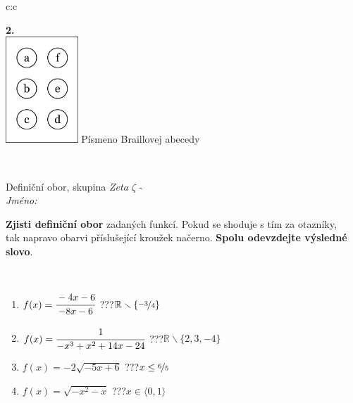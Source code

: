 \documentclass[10pt]{report}
\begin{document}
\begin{tabular}{c:c}
\begin{minipage}[c][104.5mm][t]{0.5\linewidth}
\begin{center}
\begin{minipage}{0.20\linewidth}
\begin{center}
{\Huge\bfseries 2.} \\[2mm]
\includegraphics[height=40mm]{../images/braille.png}
{\small Písmeno Braillovej abecedy}
\end{center}
\end{minipage}
\end{center}
\end{minipage}
\\ \hdashline
\begin{minipage}[c][104.5mm][t]{0.5\linewidth}
\begin{center}
\vspace{7mm}
{\huge Definiční obor, skupina \textit{Zeta $\zeta$} -}\\[5mm]
\textit{Jméno:}\phantom{xxxxxxxxxxxxxxxxxxxxxxxxxxxxxxxxxxxxxxxxxxxxxxxxxxxxxxxxxxxxxxxxx}\\[5mm]
\begin{minipage}{0.95\linewidth}
\begin{center}
\textbf{Zjisti definiční obor} zadaných funkcí. Pokud se shoduje s tím za otazníky,\\tak napravo obarvi příslušející kroužek načerno. \textbf{Spolu odevzdejte výsledné slovo}.
\end{center}
\end{minipage}
\\[1mm]
\begin{minipage}{0.79\linewidth}
\begin{center}
\begin{varwidth}{\linewidth}
\begin{enumerate}
\normalsizerrr
\item $f(x)=\cfrac{-4x-6}{-8x-6}$\quad \dotfill\; ???\;\dotfill \quad $\mathbb{R}\smallsetminus\{\nicefrac{-3}{4}\}$
\item $f(x)=\cfrac{1}{-x^3+x^2+14x-24}$\quad \dotfill\; ???\;\dotfill \quad $\mathbb{R}\smallsetminus\{2,3,-4\}$
\item $f(x)=-2\sqrt{-5x+6}$\quad \dotfill\; ???\;\dotfill \quad $x\leq\nicefrac{6}{5}$
\item $f(x)=\sqrt{-x^2-x}$\quad \dotfill\; ???\;\dotfill \quad $x\in\langle0 , 1\rangle$

\end{enumerate}
\end{varwidth}
\end{center}
\end{minipage}
\end{center}
\end{minipage}
\end{tabular}
\end{document}
